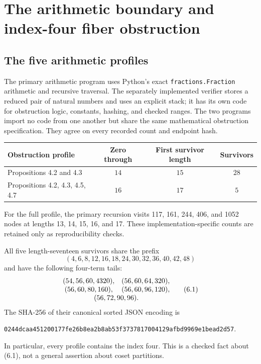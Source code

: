 \documentclass[11pt]{article}
\theoremstyle{definition}
\begin{document}
\section{The arithmetic boundary and index-four fiber obstruction}
\label{sec:boundary}

\subsection{The five arithmetic profiles}

The primary arithmetic program uses Python's exact
\texttt{fractions.Fraction} arithmetic and recursive traversal. The
separately implemented verifier stores a reduced pair of natural numbers and
uses an explicit stack; it has its own code for obstruction logic, constants,
hashing, and checked ranges. The two programs import no code from one another
but share the same mathematical obstruction specification. They agree on every
recorded count and endpoint hash.

\begin{center}
\begin{tabular}{@{}lccc@{}}
\toprule
Obstruction profile & Zero through & First survivor length & Survivors \\
\midrule
Propositions 4.2 and 4.3 & $14$ & $15$ & $28$ \\
Propositions 4.2, 4.3, 4.5, 4.7 & $16$ & $17$ & $5$ \\
\bottomrule
\end{tabular}
\end{center}

For the full profile, the primary recursion visits 117, 161, 244, 406, and
1052 nodes at lengths 13, 14, 15, 16, and 17. These implementation-specific
counts are retained only as reproducibility checks.

All five length-seventeen survivors share the prefix
\[
  (4,6,8,12,16,18,24,30,32,36,40,42,48)
\]
and have the following four-term tails:
\[
\begin{array}{@{}cc@{}}
(54,56,60,4320), & (56,60,64,320),\\
(56,60,80,160), & (56,60,96,120),\\
\multicolumn{2}{c}{(56,72,90,96).}
\end{array}
\tag{6.1}
\]
The SHA-256 of their canonical sorted JSON encoding is
\begin{center}
\small\nolinkurl{0244dcaa451200177fe26b8ea2b8ab53f3737817004129afbd9969e1bead2d57}.
\end{center}
In particular, every profile contains the index four. This is a checked fact
about (6.1), not a general assertion about coset partitions.
\end{document}
